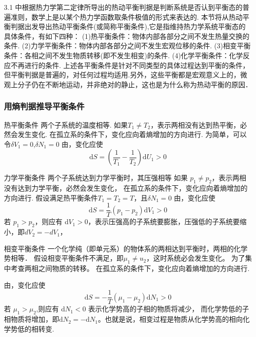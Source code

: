 3.1 中根据热力学第二定律所导出的热动平衡判据是判断系统是否认到平衡态的普遍准则，数学上是以某个热力学函数取条件极值的形式来表达的.
本节将从热动平衡判据出发导出热动平衡条件(或简称平衡条件),它是指维持热力学系统平衡态的具体条件，有如下四种：
(1)热平衡条件：物体内部各部分之间不发生热量交换的条件.
(2)力学平衡条件：物体内部各部分之间不发生宏观位移的条件.
(3)相变平衡条件：各相之间不发生物质转移(即不发生相变)的条件.
(4)化学平衡条件：化学反应不再进行的条件.
上述各平衡条件是针对不同类型的具体过程达到平衡的条件，但平衡判据是普遍的，对任何过程均适用.另外，这些平衡都是宏观意义上的，微观上分子仍在不断地运动，并非绝对的静止，这也是为什么称为热动平衡的原因．

\subsubsection{用熵判据推导平衡条件}
热平衡条件
两个子系统的温度相等.
如果$T_1\neq T_2$，表示两相没有达到热平衡，必然会发生变化.
在孤立系的条件下，变化应向着熵增加的方向进行.
为简单，可以令$\delta V_1=0$,$\delta N_1=0$
由，变化应使
\begin{equation}
    \mathrm{d}S=\left( \frac{1}{T_1}-\frac{1}{T_2} \right) \mathrm{d}U_1>0
\end{equation}


力学平衡条件
两个子系统达到力学平衡时，其压强相等
如果 $p_1\neq p_2$，表示两相没有达到力学平衡，必然会发生变化，
在孤立系的条件下，变化应向着熵增加的方向进行.
假设满足热平衡条件$T_1=T_2=T$，且$\delta N_1=0$
由，变化应使
\begin{equation}
    \mathrm{d}S=\frac{1}{T}\left( p_1-p_2 \right) \mathrm{d}V_1>0
\end{equation}
若 $p_1>p_2$，则应有 d$V_1>0$，表示压强高的子系统要膨胀，压强低的子系统要缩小，即$dV_2=-dV_1$，


相变平衡条件
一个化学纯（即单元系）的物体系的两相达到平衡时，两相的化学势相等．
假设相变平衡条件不满足，即$\mu_1\neq u_2$，这时系统必会发生变化。
为了集中考查两相之间物质的转移。
在孤立系的条件下，变化应向着熵增加的方向进行.

由，变化应使
\begin{equation}
    \mathrm{d}S=-\frac{1}{T}\left( \mu _1-\mu _2 \right) \mathrm{d}N_1>0
\end{equation}
若 $\mu_1>\mu_2$,则应有 d$N_1<0$ 表示化学势高的子相的物质将减少， 而化学势低的子相物质将增加，即$\mathrm{d}N_2=-\mathrm{d}N_1$。也就是说，相变过程是物质从化学势高的相向化学势低的相转变.


